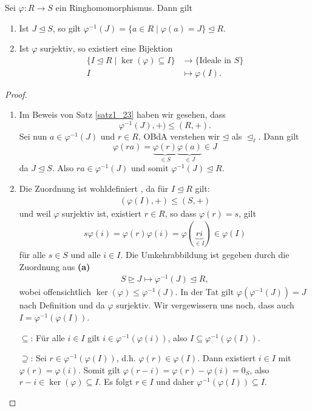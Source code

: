 \begin{satz}[Idealkorrespondenz]\label{satz4_13}
	Sei $\varphi\colon R \to S$ ein Ringhomomorphismus. Dann gilt
	\begin{enumerate}[label=(\alph*)]
		\item Ist $J \unlhd S$, so gilt $\varphi^{-1}(J) = \{a \in R \mid \varphi(a) = J\} \unlhd R$.
		\item Ist $\varphi$ surjektiv, so existiert eine Bijektion
		\begin{align*}
			\{I \unlhd R \mid \ker(\varphi) \subseteq I\} &\to \{\text{Ideale in } S\}\\
			I &\mapsto \varphi(I).
		\end{align*}
	\end{enumerate}
\end{satz}
\begin{proof}
	\begin{enumerate}[label=(\alph*)]
		\item Im Beweis von Satz \ref{satz1_23} haben wir gesehen, dass
		\[\varphi^{-1}(J), +) \leq (R,+).\]
		Sei nun $a \in \varphi^{-1}(J)$ und $r \in R$. OBdA verstehen wir $\unlhd$ als $\unlhd_\ell$. Dann gilt
		\[\varphi(ra) = \underbrace{\varphi(r)}_{\in S}\underbrace{\varphi(a)}_{\in J} \in J\]
		da $J \unlhd S$. Also $ra \in \varphi^{-1}(J)$ und somit $\varphi^{-1}(J) \unlhd R$.
		\item Die Zuordnung ist wohldefiniert , da für $I \unlhd R$ gilt:
		\begin{align*}
			(\varphi(I), +) \leq (S,+) 
		\end{align*}
		und weil $\varphi$ surjektiv ist, existiert $r \in R$, so dass $\varphi(r) = s$, gilt
		\begin{align*}
			s \varphi(i) = \varphi(r)\varphi(i) = \varphi(\underbrace{ri}_{\in I}) \in \varphi(I)
		\end{align*}
		für alle $s \in S$ und alle $i \in I$. Die Umkehrabbildung ist gegeben durch die Zuordnung aus \textbf{(a)}
		\begin{align*}
			S \unrhd J \mapsto \varphi^{-1}(J) \unlhd R,
		\end{align*}
		wobei offensichtlich $\ker(\varphi) \leq \varphi^{-1}(J)$. In der Tat gilt $\varphi(\varphi^{-1}(J)) = J$ nach Definition und da $\varphi$ surjektiv. Wir vergewissern uns noch, dass auch $I = \varphi^{-1}(\varphi(I))$.
		
		\glqq{}$\subseteq$\grqq: Für alle $i \in I$ gilt $i \in \varphi^{-1}(\varphi(i))$, also $I \subseteq \varphi^{-1}(\varphi(I))$.
		
		\glqq{}$\supseteq$\grqq: Sei $r \in \varphi^{-1}(\varphi(I))$, d.h. $\varphi(r) \in \varphi(I)$. Dann existiert $i \in I$ mit $\varphi(r) = \varphi(i)$. Somit gilt $\varphi(r-i) = \varphi(r) - \varphi(i) = 0_S$, also $r-i \in \ker(\varphi) \subseteq I$. Es folgt $r \in I$ und daher $\varphi^{-1}(\varphi(I)) \subseteq I$.
	\end{enumerate}
\end{proof}
